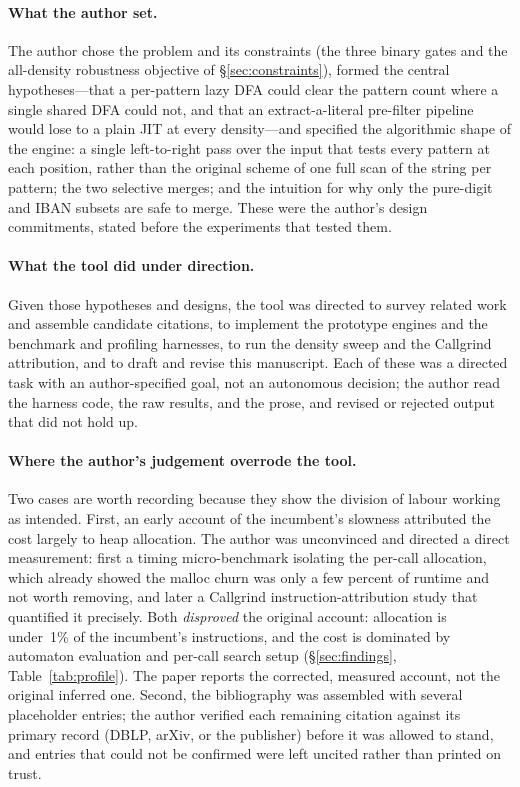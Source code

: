 \documentclass[acmsmall,nonacm,screen]{acmart}
\begin{document}
\paragraph{What the author set.} The author chose the problem and its constraints
(the three binary gates and the all-density robustness objective of
\S\ref{sec:constraints}), formed the central hypotheses---that a per-pattern lazy
DFA could clear the pattern count where a single shared DFA could not, and that an
extract-a-literal pre-filter pipeline would lose to a plain JIT at every density---and
specified the algorithmic shape of the engine: a single left-to-right pass over the
input that tests every pattern at each position, rather than the original scheme of
one full scan of the string per pattern; the two selective merges; and the intuition
for why only the pure-digit and IBAN subsets are safe to merge. These were the
author's design commitments, stated before the experiments that tested them.

\paragraph{What the tool did under direction.} Given those hypotheses and designs,
the tool was directed to survey related work and assemble candidate citations, to
implement the prototype engines and the benchmark and profiling harnesses, to run
the density sweep and the Callgrind attribution, and to draft and revise this
manuscript. Each of these was a directed task with an author-specified goal, not an
autonomous decision; the author read the harness code, the raw results, and the prose,
and revised or rejected output that did not hold up.

\paragraph{Where the author's judgement overrode the tool.} Two cases are worth
recording because they show the division of labour working as intended. First, an
early account of the incumbent's slowness attributed the cost largely to heap
allocation. The author was unconvinced and directed a direct measurement: first a
timing micro-benchmark isolating the per-call allocation, which already showed the
malloc churn was only a few percent of runtime and not worth removing, and later a
Callgrind instruction-attribution study that quantified it precisely. Both
\emph{disproved} the original account: allocation is under~1\% of the incumbent's
instructions, and the cost is dominated by automaton evaluation and per-call search
setup (\S\ref{sec:findings}, Table~\ref{tab:profile}). The paper reports the corrected,
measured account, not the original inferred one. Second, the bibliography was assembled
with several placeholder entries; the author verified each remaining citation against
its primary record (DBLP, arXiv, or the publisher) before it was allowed to stand, and
entries that could not be confirmed were left uncited rather than printed on trust.
\end{document}
